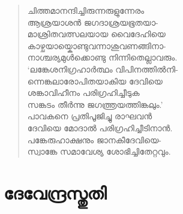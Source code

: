 \begin{verse}
ചിത്തമാനന്ദിച്ചിരുന്നരുളുന്നേരം\\
ആശ്രയാശന്‍ ജഗദാശ്രയഭൂതയാ-\\
മാശ്രിതവത്സലയായ വൈദേഹിയെ\\
കാഴ്ചയായ്കൊണ്ടുവന്നാശുവണങ്ങിനാ-\\
നാശ്ചര്യമുള്‍ക്കൊണ്ടു നിന്നിതെല്ലാവരും.\\
‘ലങ്കേശനിഗ്രഹാര്‍ത്ഥം വിപിനത്തില്‍നി-\\
ന്നെങ്കലാരോപിതയാകിയ ദേവിയെ\\
ശങ്കാവിഹീനം പരിഗ്രഹിച്ചീടുക\\
സങ്കടം തീര്‍ന്നു ജഗത്ത്രയത്തിങ്കലും.’\\
പാവകനെ പ്രതിപൂജിച്ചു രാഘവന്‍\\
ദേവിയെ മോദാല്‍ പരിഗ്രഹിച്ചീടിനാന്‍.\\
പങ്കേരുഹാക്ഷനും ജാനകീദേവിയെ-\\
സ്വാങ്കേ സമാവേശ്യ ശോഭിച്ചിതേറ്റവും.
\end{verse}


\section{ദേവേന്ദ്രസ്തുതി}

